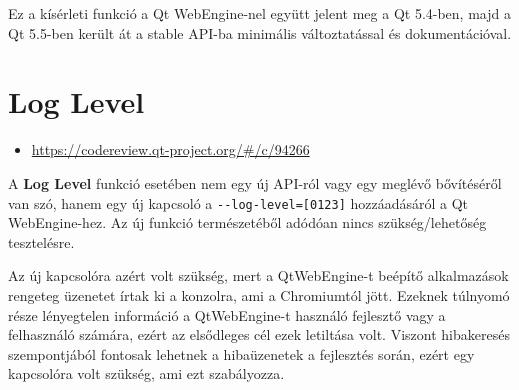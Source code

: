 \documentclass[12pt]{report}
\let\origurl\url
\renewcommand{\url}[1]{%
    \textcolor{blue}{\origurl{#1}}
}
\newcommand{\gerrit}[1]{%
    \textcolor{qtgreen}{\origurl{https://codereview.qt-project.org/\#/c/#1}}
}
\begin{document}
Ez a kísérleti funkció a Qt WebEngine-nel együtt jelent meg a Qt 5.4-ben, majd a Qt 5.5-ben
került át a stable API-ba minimális változtatással és dokumentációval.


\section{Log Level}

\begin{center}
    \begin{reviewbox}
        \begin{itemize}
            \renewcommand{\labelitemi}{\textcolor{qtgreen}{$\blacktriangleright$}}
            \item \gerrit{94266}
        \end{itemize}
    \end{reviewbox}
\end{center}

\noindent
A \textbf{Log Level} funkció esetében nem egy új API-ról vagy egy meglévő bővítéséről van
szó, hanem egy új kapcsoló a \texttt{-{}-log-level=[0123]} hozzáadásáról a Qt WebEngine-hez.
Az új funkció természetéből adódóan nincs szükség/lehetőség tesztelésre.

Az új kapcsolóra azért volt szükség, mert a QtWebEngine-t beépítő alkalmazások rengeteg
üzenetet írtak ki a konzolra, ami a Chromiumtól jött. Ezeknek túlnyomó része lényegtelen
információ a QtWebEngine-t használó fejlesztő vagy a felhasználó számára, ezért az elsődleges
cél ezek letiltása volt. Viszont hibakeresés szempontjából fontosak lehetnek a hibaüzenetek a
fejlesztés során, ezért egy kapcsolóra volt szükség, ami ezt szabályozza.
\end{document}
